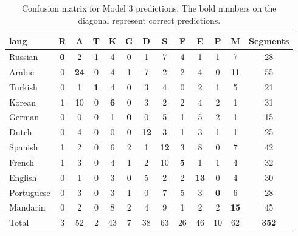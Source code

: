 \documentclass[11pt, letterpaper]{article}
\begin{document}
\begin{table}
\begin{center}
\caption{Confusion matrix for Model 3 predictions. The bold numbers on the diagonal represent correct predictions.}
\begin{tabular}{l | c c c c c c c c c c c || c}
lang			&R &A &T &K &G &D &S &F &E &P &M & Segments\\ \hline
Russian		&\textbf{0}  &2  &1  &4  &0  &1  &7  &4  &1  &1  &7 &28\\
Arabic		&0 &\textbf{24}  &0  &4  &1  &7  &2  &2  &4  &0 &11 &55\\
Turkish		&0  &1  &\textbf{1}  &4  &0  &3  &4  &0   &2  &1  &5 &21\\
Korean		&1 &10  &0  &\textbf{6}  &0  &3  &2  &2  &4  &2  &1 &31\\
German		&0  &0  &0  &1  &\textbf{0}  &0  &5  &1  &5  &2  &1 &15\\
Dutch		&0  &4  &0  &0  &0 &\textbf{12} & 3  &1  &3  &1  &1 &25\\
Spanish		&1  &2  &0  &6  &2  &1 &\textbf{12}  &3  &8  &0  &7 &42\\
French		&1  &3  &0  &4  &1  &2 &10 & \textbf{5}  &1  &1  &4 &32\\
English		&0  &1  &0  &3  &0  &5  &2  &2 &\textbf{13}  &0  &4 &30\\
Portuguese	&0  &3  &0  &3  &1  &0  &7  &5  &3  &\textbf{0}  &6 &28\\
Mandarin		&0  &2 & 0  &8  &2  &4  &9  &1  &2  &2 &\textbf{15} &45\\ \hline
Total			&3 &52 &2 &43 &7 &38 &63 &26 &46 &10 &62 &\textbf{352}\\

\end{tabular}
\label{tab:LangConfMat}
\end{center}
\end{table}
\end{document}
